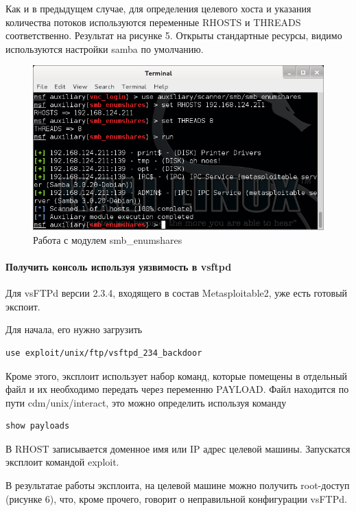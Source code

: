 Как и в предыдущем случае, для определения целевого хоста и указания количества потоков используются переменные RHOSTS и THREADS соответственно. Результат на рисунке 5. Открыты стандартные ресурсы, видимо используются настройки samba по умолчанию.

\begin{figure}[h!]
\centering
\includegraphics[scale=1]{res/pic05}
\caption{Работа с модулем smb\_enumshares}
\end{figure}


\paragraph{Получить консоль используя уязвимость в vsftpd}


Для vsFTPd версии 2.3.4, входящего в состав Metasploitable2, уже есть готовый экспоит.

Для начала, его нужно загрузить

\begin{Verbatim}[frame=single]
use exploit/unix/ftp/vsftpd_234_backdoor
\end{Verbatim}

Кроме этого, эксплоит использует набор команд, которые помещены в отдельный файл и их необходимо передать через переменню PAYLOAD. Файл находится по пути cdm/unix/interact, это можно определить используя команду

\begin{Verbatim}[frame=single]
show payloads
\end{Verbatim}

В RHOST записывается доменное имя или IP адрес целевой машины. Запускатся эксплоит командой exploit.

В результатае работы эксплоита, на целевой машине можно получить root-доступ (рисунке 6), что, кроме прочего, говорит о неправильной конфигурации vsFTPd.

